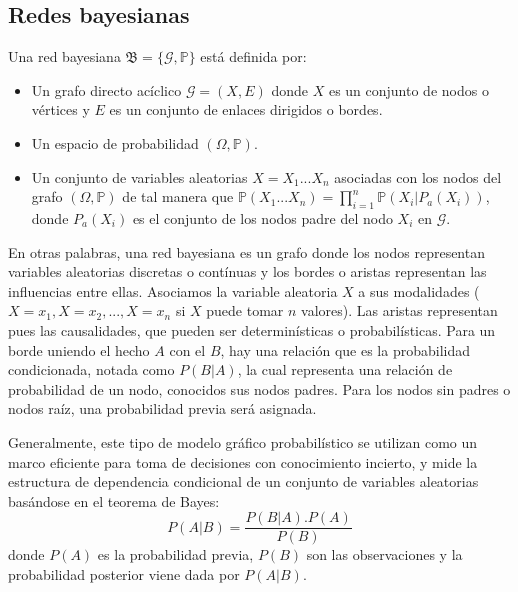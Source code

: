 \subsection{Redes bayesianas}
\begin{definicion}\label{def:BN}
Una red bayesiana\cite{def-bncn} $\mathfrak{B} = \lbrace \mathcal{G}, \mathbb{P} \rbrace$ está definida por:
\begin{itemize}
    \item Un grafo directo acíclico $\mathcal{G}=(X,E)$ donde $X$ es un conjunto de nodos o vértices y $E$ 
    es un conjunto de enlaces dirigidos o bordes.
    \item Un espacio de probabilidad $(\Omega, \mathbb{P})$.
    \item Un conjunto de variables aleatorias $X={X_1...X_n}$ asociadas con los nodos del grafo $(\Omega, \mathbb{P})$ 
    de tal manera que $\mathbb{P}(X_1...X_n)= \prod_{i=1}^{n}\mathbb{P}(X_i|P_a(X_i))$, donde $P_a(X_i)$ es el 
    conjunto de los nodos padre del nodo $X_i$ en $\mathcal{G}$.  
\end{itemize}
\end{definicion}

En otras palabras, una red bayesiana es un grafo donde los nodos representan variables aleatorias discretas o contínuas 
y los bordes o aristas representan las influencias entre ellas. Asociamos la variable aleatoria $X$ a sus modalidades 
($X=x_1, X=x_2,..., X=x_n$ si $X$ puede tomar $n$ valores). Las aristas representan pues las causalidades, que pueden ser determinísticas 
o probabilísticas. Para un borde uniendo el hecho $A$ con el $B$, hay una relación que es la probabilidad condicionada, notada como $P(B|A)$, 
la cual representa una relación de probabilidad de un nodo, conocidos sus nodos padres. Para los nodos sin padres o nodos raíz, una probabilidad 
previa será asignada.

Generalmente, este tipo de modelo gráfico probabilístico se utilizan como un marco eficiente para
toma de decisiones con conocimiento incierto, y mide la estructura de dependencia condicional
de un conjunto de variables aleatorias basándose en el teorema de Bayes:\\
\begin{equation}
\label{eq:bayes}
P(A|B) = \frac{P(B|A).P(A)}{P(B)}
\end{equation}
donde $P(A)$ es la probabilidad previa, $P(B)$ son las observaciones y la probabilidad posterior viene dada 
por $P(A|B)$.\cite{YANG201919}

